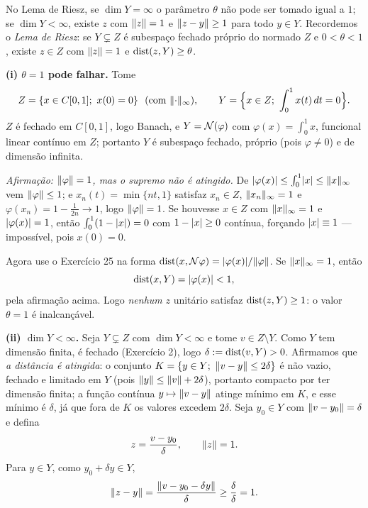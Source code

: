 \begin{exercicio}{No Lema de Riesz, se $\dim Y=\infty$ o parâmetro $\theta$ não pode ser tomado igual a $1$; se $\dim Y<\infty$, existe $z$ com $\lVert z\rVert=1$ e $\lVert z-y\rVert\ge1$ para todo $y\in Y$.}
\sol
Recordemos o \emph{Lema de Riesz}: se $Y\subsetneq Z$ é subespaço fechado próprio do normado $Z$ e $0<\theta<1$, existe $z\in Z$ com $\lVert z\rVert=1$ e $\operatorname{dist}(z,Y)\ge\theta$.

\textbf{(i) $\theta=1$ pode falhar.} Tome
\[ Z=\{x\in C[0,1];\ x(0)=0\}\ \ (\text{com } \lVert\cdot\rVert_\infty), \qquad Y=\Bigl\{x\in Z;\ \int_0^1x(t)\,dt=0\Bigr\}. \]
$Z$ é fechado em $C[0,1]$, logo Banach, e $Y=\mathcal{N}(\varphi)$ com $\varphi(x)=\int_0^1x$, funcional linear contínuo em $Z$; portanto $Y$ é subespaço fechado, próprio (pois $\varphi\neq0$) e de dimensão infinita.

\emph{Afirmação: $\lVert\varphi\rVert=1$, mas o supremo não é atingido.} De $\lvert\varphi(x)\rvert\le\int_0^1\lvert x\rvert\le\lVert x\rVert_\infty$ vem $\lVert\varphi\rVert\le1$; e $x_n(t)=\min\{nt,1\}$ satisfaz $x_n\in Z$, $\lVert x_n\rVert_\infty=1$ e $\varphi(x_n)=1-\frac{1}{2n}\to1$, logo $\lVert\varphi\rVert=1$. Se houvesse $x\in Z$ com $\lVert x\rVert_\infty=1$ e $\lvert\varphi(x)\rvert=1$, então $\int_0^1(1-\lvert x\rvert)=0$ com $1-\lvert x\rvert\ge0$ contínua, forçando $\lvert x\rvert\equiv1$ --- impossível, pois $x(0)=0$.

Agora use o Exercício 25 na forma $\operatorname{dist}(x,\mathcal{N}\varphi)=\lvert\varphi(x)\rvert/\lVert\varphi\rVert$. Se $\lVert x\rVert_\infty=1$, então
\[ \operatorname{dist}(x,Y)=\lvert\varphi(x)\rvert<1, \]
pela afirmação acima. Logo \emph{nenhum} $z$ unitário satisfaz $\operatorname{dist}(z,Y)\ge1$: o valor $\theta=1$ é inalcançável.

\textbf{(ii) $\dim Y<\infty$.} Seja $Y\subsetneq Z$ com $\dim Y<\infty$ e tome $v\in Z\setminus Y$. Como $Y$ tem dimensão finita, é fechado (Exercício 2), logo $\delta:=\operatorname{dist}(v,Y)>0$. Afirmamos que \emph{a distância é atingida}: o conjunto $K=\{y\in Y;\ \lVert v-y\rVert\le 2\delta\}$ é não vazio, fechado e limitado em $Y$ (pois $\lVert y\rVert\le\lVert v\rVert+2\delta$), portanto compacto por ter dimensão finita; a função contínua $y\mapsto\lVert v-y\rVert$ atinge mínimo em $K$, e esse mínimo é $\delta$, já que fora de $K$ os valores excedem $2\delta$. Seja $y_0\in Y$ com $\lVert v-y_0\rVert=\delta$ e defina
\[ z=\frac{v-y_0}{\delta},\qquad \lVert z\rVert=1. \]
Para $y\in Y$, como $y_0+\delta y\in Y$,
\[ \lVert z-y\rVert=\frac{\lVert v-y_0-\delta y\rVert}{\delta}\ge\frac{\delta}{\delta}=1. \]
\end{exercicio}

